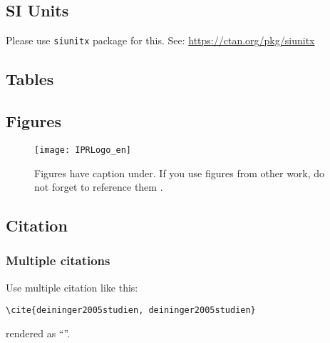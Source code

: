 \subsection{SI Units}
Please use \texttt{siunitx} package for this. See:  \url{https://ctan.org/pkg/siunitx}

\subsection{Tables}
\begin{table}[H]
\caption{Tables have caption on top.}
\label{tab:table_caption}
\centering
{}
\end{table}

\subsection{Figures}
\begin{figure}[H]
    \centering
    \texttt{[image: IPRLogo\_en]}
    \caption{Figures have caption under. If you use figures from other work, do not forget to reference them \cite{deininger2005studien}.}
    \label{fig:figure_caption}
\end{figure}

\subsection{Citation}

\subsubsection{Multiple citations}
Use multiple citation like this:
{\small
\begin{verbatim}
\cite{deininger2005studien, deininger2005studien}
\end{verbatim}
}
rendered as ``\cite{deininger2005studien, deininger2005studien}''.


